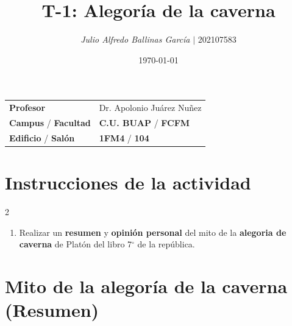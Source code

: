 \documentclass{article}
\title{ \textcolor{Tarawera}{\textbf{T-\textcolor{Sun}{\textbf{1}}}}: \textcolor{Apple Green}{\textbf{Alegoría de la caverna}}}
\author{\emph{Julio Alfredo Ballinas García} $\boldsymbol{\mid}$ 202107583}
\date{\today}
\begin{document}
\maketitle



\begin{mybox}
	\noindent\begin{tabular}{@{}ll}
		{\bfseries{Profesor}} & Dr. Apolonio Juárez Nuñez\\
		\textcolor{prussianblue}{\bfseries{Campus}} / \textcolor{trueblue}{\bfseries{Facultad}}  & \textcolor{prussianblue}{\bfseries{C.U. BUAP}} /  \textcolor{trueblue}{\bfseries{FCFM}} \\
		\textcolor{prussianblue}{\bfseries{Edificio}} /  \textcolor{trueblue}{\bfseries{Salón}}    & 	\textcolor{prussianblue}{\bfseries{1FM4}} /  \textcolor{trueblue}{\bfseries{104}}   
	\end{tabular} 
\end{mybox} \vspace{1cm}

\section*{Instrucciones de la actividad}

\setlength{\columnsep}{2cm}
\begin{multicols}{2} %
	\begin{enumerate}[label={{\textcolor{trueblue}{\textbf{Ej}. \arabic*.0}}}, start=1]
		\item Realizar un \textcolor{Cinnabar}{\textbf{resumen}} y \textcolor{trueblue}{\textbf{opinión personal}} del mito de la \textcolor{Apple Green}{\textbf{alegoria de caverna}} de Platón del libro 7$^{\circ}$ de la república.
	\end{enumerate}
\end{multicols} 

\vspace{2cm}


\tableofcontents  \vspace{2cm}

\section*{Mito de la alegoría de la caverna (\textcolor{Cinnabar}{\textbf{Resumen}})}
\end{document}
